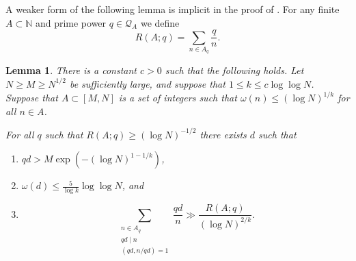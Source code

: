 \documentclass{amsart}
\newcommand{\bbn}{\mathbb{N}}
\newtheorem{lemma}{Lemma}
\begin{document}
A weaker form of the following lemma is implicit in the proof of \cite[Proposition 3]{Cr2003}. For any finite $A\subset \bbn$ and prime power $q\in\mathcal{Q}_A$ we define\label{def-raq}
\[R(A;q) = \sum_{n\in A_q}\frac{q}{n}.\]
\begin{lemma}\label{lem-usingq}
There is a constant $c>0$ such that the following holds. Let $N\geq M\geq N^{1/2}$ be sufficiently large, and suppose that $1\leq k \leq c\log\log N$. Suppose that $A\subset [M,N]$ is a set of integers such that $\omega(n)\leq (\log N)^{1/k}$ for all $n\in A$. 

For all $q$ such that $R(A;q)\geq (\log N)^{-1/2}$ there exists $d$ such that
\begin{enumerate}
\item $qd > M\exp(-(\log N)^{1-1/k})$,
\item $\omega(d)\leq \tfrac{5}{\log k}\log\log N$, and
\item \[\sum_{\substack{n\in A_q\\qd\mid n\\ (qd,n/qd)=1}}\frac{qd}{n}\gg \frac{R(A;q)}{(\log N)^{2/k}}.\]
\end{enumerate}
\end{lemma}
\end{document}
